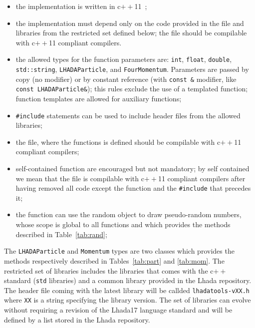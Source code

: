 \documentclass[11pt]{cernrep}
\begin{document}
\begin{itemize}
\item the implementation is written in c$++$11~\cite{bib:c++11};
\item the implementation must depend only on the code provided in the file and libraries from the restricted set defined below; the file should be compilable with c$++$11 compliant compilers.
\item the allowed types for the function parameters are: {\tt int}, {\tt float}, {\tt double}, {\tt std::string}, {\tt LHADAParticle}, and {\tt FourMomentum}. Parameters are passed by copy (no modifier) or by constant reference (with {\tt const \&} modifier, like {\tt const LHADAParticle\&}); this rules exclude the use of a templated function; function templates are allowed for auxiliary functions; 
\item {\tt \#include} statements can be used to include header files from the allowed libraries;
\item the file, where the functions is defined should be compilable with c$++$11 compliant compilers;
\item self-contained function are encouraged but not mandatory; by self contained we mean that the file is compilable with c$++$11 compliant compilers after having removed all code except the function and the {\tt \#include} that precedes it;
\item the function can use the random object to draw pseudo-random numbers, whose scope is global to all functions and which provides the methods described in Table~\ref{tab:rand}; 
\end{itemize}

The {\tt LHADAParticle} and {\tt Momentum} types are two classes which provides the methods respectively described in Tables~\ref{tab:part} and \ref{tab:mom}. The restricted set of libraries includes the libraries that comes with the c$++$ standard ({\tt std} libraries) and a common library provided in the {\sc Lhada} repository. The header file coming with the latest library will be callded {\tt lhadatools-vXX.h} where {\tt XX} is a string specifying the library version. The set of libraries can evolve without requiring a revision of the {\sc Lhada17} language standard and will be defined by a list stored in the {\sc Lhada} repository.
\end{document}
